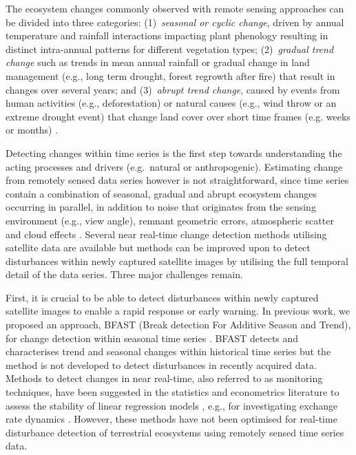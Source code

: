 \documentclass[authoryear,preprint,review,10pt]{elsarticle}
\begin{document}
The ecosystem changes commonly observed with remote sensing approaches can be divided into three categories: (1)~\emph{seasonal or cyclic change}, driven by annual temperature and rainfall interactions impacting plant phenology resulting in distinct intra-annual patterns for different vegetation types; (2)~\emph{gradual trend change} such as trends in mean annual rainfall or gradual change in land management (e.g., long term drought, forest regrowth after fire) that result in changes over several years; and (3)~\emph{abrupt trend change}, caused by events from human activities (e.g., deforestation) or natural causes (e.g., wind throw or an extreme drought event) that change land cover over short time frames (e.g. weeks or months) 
\citep{Beurs2005a,Verbesselt2009a,Verbesselt:2010wo}. 

Detecting changes within time series is the first step towards understanding the acting processes and drivers (e.g.\ natural or anthropogenic). Estimating change from remotely sensed data series however is not straightforward, since time series contain a combination of seasonal, gradual and abrupt ecosystem changes occurring in parallel, in addition to noise that originates from the sensing environment (e.g., view angle), remnant geometric errors, atmospheric scatter and cloud effects \citep{Beurs2005a, Roy2002, Wolfe1998}. Several near real-time change detection methods utilising satellite data are available \citep{Jiang:2010ko, Verdin:2005by, White2006} but methods can be improved upon to detect disturbances within newly captured satellite images by utilising the full temporal detail of the data series. Three major challenges remain.

First, it is crucial to be able to detect disturbances within newly captured satellite images to enable a rapid response or early warning. In previous work, we proposed an approach,  BFAST (Break detection For Additive Season and Trend), for change detection within seasonal time series \citep{deJong:wo, Verbesselt2009a,Verbesselt:2010wo}.
BFAST detects and characterises trend and seasonal changes within historical time series but the method is not developed to detect disturbances in recently acquired data. Methods to detect changes in near real-time, also referred to as monitoring techniques, have been suggested in the statistics and econometrics literature to assess the stability of linear regression models \citep{Chu1996}, e.g., for investigating exchange rate dynamics \citep{Zeileis:2010tt}. However, these methods have not been optimised for real-time disturbance detection of terrestrial ecosystems using remotely sensed time series data.
\end{document}
